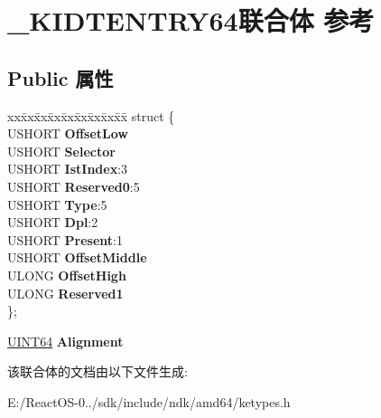 \hypertarget{union___k_i_d_t_e_n_t_r_y64}{}\section{\+\_\+\+K\+I\+D\+T\+E\+N\+T\+R\+Y64联合体 参考}
\label{union___k_i_d_t_e_n_t_r_y64}
\subsection*{Public 属性}
\begin{DoxyCompactItemize}
\item 
\mbox{\label{union___k_i_d_t_e_n_t_r_y64_af9002e957cad25ca57549bfad69001e9}} 
\begin{tabbing}
xx\=xx\=xx\=xx\=xx\=xx\=xx\=xx\=xx\=\kill
struct \{\\
\>USHORT {\bfseries OffsetLow}\\
\>USHORT {\bfseries Selector}\\
\>USHORT {\bfseries IstIndex}:3\\
\>USHORT {\bfseries Reserved0}:5\\
\>USHORT {\bfseries Type}:5\\
\>USHORT {\bfseries Dpl}:2\\
\>USHORT {\bfseries Present}:1\\
\>USHORT {\bfseries OffsetMiddle}\\
\>ULONG {\bfseries OffsetHigh}\\
\>ULONG {\bfseries Reserved1}\\
\}; \\

\end{tabbing}\item 
\mbox{\label{union___k_i_d_t_e_n_t_r_y64_a886c871d7d35d91466c6a25a92700fa2}} 
\hyperlink{_processor_bind_8h_a57be03562867144161c1bfee95ca8f7c}{U\+I\+N\+T64} {\bfseries Alignment}
\end{DoxyCompactItemize}


该联合体的文档由以下文件生成\+:\begin{DoxyCompactItemize}
\item 
E\+:/\+React\+O\+S-\/0../sdk/include/ndk/amd64/ketypes.\+h\end{DoxyCompactItemize}
